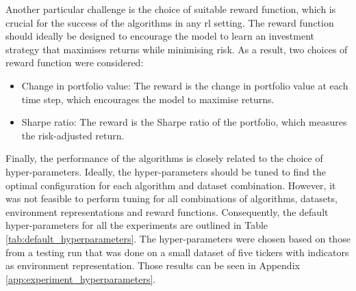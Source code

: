 Another particular challenge is the choice of suitable reward function, which is crucial for the success of the algorithms in any \acrshort{rl} setting. The reward function should ideally be designed to encourage the model to learn an investment strategy that maximises returns while minimising risk. As a result, two choices of reward function were considered:
\begin{itemize}
    \item Change in portfolio value: The reward is the change in portfolio value at each time step, which encourages the model to maximise returns.
    \item Sharpe ratio: The reward is the Sharpe ratio of the portfolio, which measures the risk-adjusted return.
\end{itemize}

Finally, the performance of the algorithms is closely related to the choice of hyper-parameters. Ideally, the hyper-parameters should be tuned to find the optimal configuration for each algorithm and dataset combination. However, it was not feasible to perform tuning for all combinations of algorithms, datasets, environment representations and reward functions. Consequently, the default hyper-parameters for all the experiments are outlined in Table \ref{tab:default_hyperparameters}. The hyper-parameters were chosen based on those from a testing run that was done on a small dataset of five tickers with indicators as environment representation. Those results can be seen in Appendix \ref{app:experiment_hyperparameters}.



